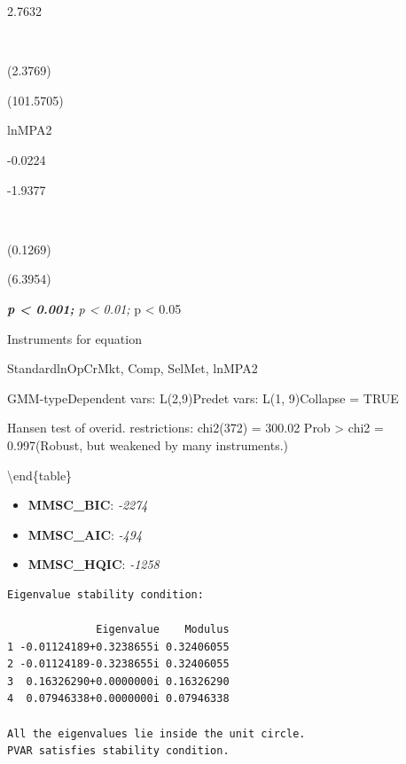 \documentclass[12pt,12pt,openright,oneside,a4paper,chapter=TITLE,section=TITLE,subsection=TITLE,subsubsection=TITLE,english,french,spanish,portugues,sumario=tradicional]{abntex2}
\providecommand{\tightlist}{%
  \setlength{\itemsep}{0pt}\setlength{\parskip}{0pt}}
\begin{document}
2.7632

~

(2.3769)

(101.5705)

lnMPA2

-0.0224

-1.9377

~

(0.1269)

(6.3954)

\emph{\textbf{p \textless{} 0.001; }p \textless{} 0.01; }p \textless{} 0.05

Instruments for equation

StandardlnOpCrMkt, Comp, SelMet, lnMPA2

GMM-typeDependent vars: L(2,9)Predet vars: L(1, 9)Collapse = TRUE

Hansen test of overid. restrictions: chi2(372) = 300.02 Prob \textgreater{} chi2 = 0.997(Robust, but weakened by many instruments.)

\vspace{1mm}

\label{tb:pvargmm}
\vspace{-2mm}
\textbackslash{}end\{table\}

\begin{itemize}
\tightlist
\item
  \textbf{MMSC\_BIC}: \emph{-2274}
\item
  \textbf{MMSC\_AIC}: \emph{-494}
\item
  \textbf{MMSC\_HQIC}: \emph{-1258}
\end{itemize}

\begin{verbatim}
Eigenvalue stability condition:

              Eigenvalue    Modulus
1 -0.01124189+0.3238655i 0.32406055
2 -0.01124189-0.3238655i 0.32406055
3  0.16326290+0.0000000i 0.16326290
4  0.07946338+0.0000000i 0.07946338

All the eigenvalues lie inside the unit circle.
PVAR satisfies stability condition.
\end{verbatim}
\end{document}
